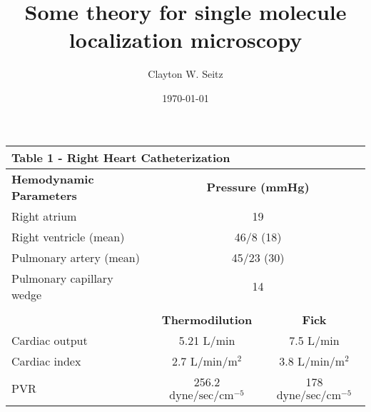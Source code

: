 \documentclass[aspectratio=169]{beamer}
\title{Some theory for single molecule localization microscopy}	%
\author{Clayton W. Seitz}								%
\date{\today}									%
\begin{document}
\begin{frame}
\begin{table}[]
\begin{tabular}{lcc}
\multicolumn{3}{l}{\textbf{Table 1 - Right Heart Catheterization}}                                                \\ \hline
\textbf{Hemodynamic Parameters} & \multicolumn{2}{c}{\textbf{Pressure (mmHg)}}                                    \\
Right atrium                    & \multicolumn{2}{c}{19}                                                          \\
Right ventricle (mean)          & \multicolumn{2}{c}{46/8 (18)}                                                   \\
Pulmonary artery (mean)         & \multicolumn{2}{c}{45/23 (30)}                                                  \\
Pulmonary capillary wedge       & \multicolumn{2}{c}{14}                                                          \\
                                & \multicolumn{1}{l}{}                    & \multicolumn{1}{l}{}                  \\
                                & \textbf{Thermodilution}                 & \textbf{Fick}                         \\
Cardiac output                  & 5.21 $\mathrm{L/min}$                              & 7.5 $\mathrm{L/min}$                             \\
Cardiac index                   & 2.7 $\mathrm{L/min/m^2}$        & 3.8 $\mathrm{L/min/m^2}$      \\
PVR                             & 256.2 $\mathrm{dyne/sec/cm^{-5}}$ & 178 $\mathrm{dyne/sec/cm^{-5}}$
\end{tabular}
\end{table}
\end{frame}

\begin{frame}
  \titlepage
\end{frame}
\end{document}
